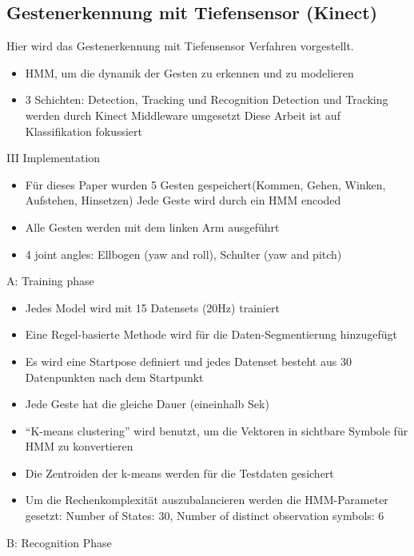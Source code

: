 \subsection{Gestenerkennung mit Tiefensensor (Kinect)}
Hier wird das Gestenerkennung mit Tiefensensor Verfahren vorgestellt. 
\begin{itemize}
\item HMM, um die dynamik der Gesten zu erkennen und zu modelieren
\item 3 Schichten: Detection, Tracking und Recognition
\subitem Detection und Tracking werden durch Kinect Middleware umgesetzt
\subitem Diese Arbeit ist auf Klassifikation fokussiert
\end{itemize}
III Implementation
\begin{itemize}
\item Für dieses Paper wurden 5 Gesten gespeichert(Kommen, Gehen, Winken, Aufstehen, Hinsetzen)
\subitem Jede Geste wird durch ein HMM encoded
\item Alle Gesten werden mit dem linken Arm ausgef\"uhrt %
\item 4 joint angles: Ellbogen (yaw and roll), Schulter (yaw and pitch)
\end{itemize}
A: Training phase
\begin{itemize}
\item Jedes Model wird mit 15 Datensets (20Hz) trainiert
\item Eine Regel-basierte Methode wird für die Daten-Segmentierung hinzugef\"ugt
\item Es wird eine Startpose definiert und jedes Datenset besteht aus 30 Datenpunkten nach dem Startpunkt
\item Jede Geste hat die gleiche Dauer (eineinhalb Sek)
\item ``K-means clustering'' wird benutzt, um die Vektoren in sichtbare Symbole f\"ur HMM zu konvertieren
\item Die Zentroiden der k-means werden f\"ur die Testdaten gesichert
\item Um die Rechenkomplexit\"at auszubalancieren werden die HMM-Parameter gesetzt: Number of States: 30, Number of distinct observation symbols: 6
\end{itemize}
B: Recognition Phase
